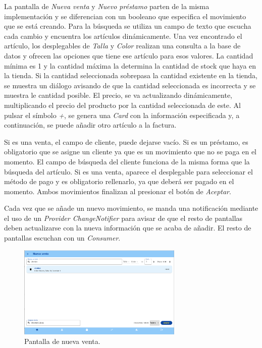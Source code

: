 La pantalla de \textit{Nueva venta} y \textit{Nuevo préstamo} parten de la misma implementación y se diferencian con un booleano que especifica el movimiento que se está creando. Para la búsqueda se utiliza un campo de texto que escucha cada cambio y encuentra los artículos dinámicamente. Una vez encontrado el artículo, los desplegables de \textit{Talla} y \textit{Color} realizan una consulta a la base de datos y ofrecen las opciones que tiene ese artículo para esos valores. La cantidad mínima es 1 y la cantidad máxima la determina la cantidad de stock que haya en la tienda. Si la cantidad seleccionada sobrepasa la cantidad existente en la tienda, se muestra un diálogo avisando de que la cantidad seleccionada es incorrecta y se muestra le cantidad posible. El precio, se va actualizando dinámicamente, multiplicando el precio del producto por la cantidad seleccionada de este. Al pulsar el símbolo \textit{+}, se genera una \textit{Card} con la información especificada y, a continuación, se puede añadir otro artículo a la factura. 

Si es una venta, el campo de cliente, puede dejarse vacío. Si es un préstamo, es obligatorio que se asigne un cliente ya que es un movimiento que no se paga en el momento. El campo de búsqueda del cliente funciona de la misma forma que la búsqueda del artículo. Si es una venta, aparece el desplegable para seleccionar el método de pago y es obligatorio rellenarlo, ya que deberá ser pagado en el momento. Ambos movimientos finalizan al presionar el botón de \textit{Aceptar}. 

Cada vez que se añade un nuevo movimiento, se manda una notificación mediante el uso de un \textit{Provider ChangeNotifier} para avisar de que el resto de pantallas deben actualizarse con la nueva información que se acaba de añadir. El resto de pantallas escuchan con un \textit{Consumer}. 

\begin{figure}[H]
	\centering
	\includegraphics[width=0.7\textwidth]{imagenes/TerceraIteracion/nuevaVenta.png}
	\caption{Pantalla de nueva venta.}
\end{figure}

